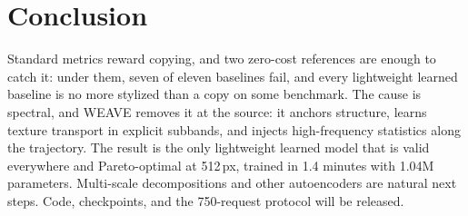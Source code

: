 \documentclass[conference]{IEEEtran}
\begin{document}
\section{Conclusion}
\label{sec:conclusion}

Standard metrics reward copying, and two zero-cost references are enough to catch it: under them, seven
of eleven baselines fail, and every lightweight learned baseline is no more stylized than a copy on some
benchmark. The cause is spectral, and WEAVE removes it at the source: it anchors structure, learns texture transport in
explicit subbands, and injects high-frequency statistics along the trajectory. The result is the only
lightweight learned model that is valid everywhere and Pareto-optimal at 512\,px, trained in 1.4 minutes with 1.04M
parameters. Multi-scale decompositions and other autoencoders are natural next steps. Code, checkpoints,
and the 750-request protocol will be released.



\end{document}
